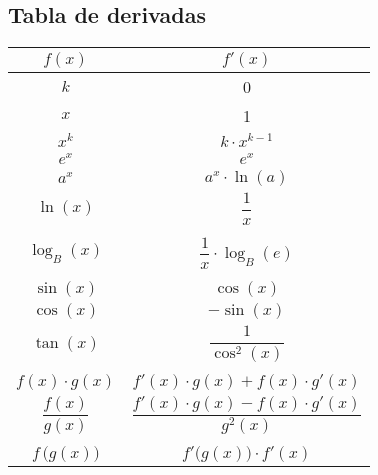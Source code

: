 \begin{multicols}{2}
\subsection*{Tabla de derivadas}
{
\renewcommand{\arraystretch}{2}
\begin{table}[H]
\centering
\begin{tabular}{|c|c|}
\hline
\rowcolor[HTML]{F0F0F0}
$f(x)$ & $f'(x)$ \\ \hline
$k$ & 0 \\ \hline
$x$ & 1 \\ \hline
$x^k$ & $k\cdot x^{k-1}$ \\ \hline 
$e^x$ & $e^x$ \\ \hline
$a^x$ & $a^x \cdot \ln(a)$ \\ \hline
$\ln(x)$ & $\dfrac{1}{x}$ \\ 
& \\[-9mm] \hline
$\log_B(x)$ & $\dfrac{1}{x}\cdot \log_B(e)$ \\
& \\[-9mm] \hline
$\sin(x)$ & $\cos(x)$ \\ \hline
$\cos(x)$ & $-\sin(x)$ \\ \hline
$\tan(x)$ & $\dfrac{1}{\cos^2(x)}$ \\
& \\[-9mm] \hline
$f(x)\cdot g(x)$ & $f'(x) \cdot g(x) + f(x) \cdot g'(x)$ \\ \hline
$\dfrac{f(x)}{g(x)}$ & $\dfrac{f'(x) \cdot g(x) - f(x) \cdot g'(x)}{g^2(x)}$ \\
& \\[-9mm] \hline
$f\,\big(g(x)\big)$ & $f'\big(g(x)\big) \cdot f'(x) $ \\ \hline
\end{tabular}
\end{table}
}
\end{multicols}